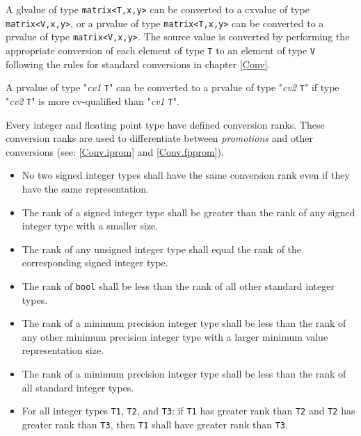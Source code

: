 \p A glvalue of type \texttt{matrix<T,x,y>} can be converted to a cxvalue of
type \texttt{matrix<V,x,y>}, or a prvalue of type \texttt{matrix<T,x,y>} can be
converted to a prvalue of type \texttt{matrix<V,x,y>}. The source value is
converted by performing the appropriate conversion of each element of type
\texttt{T} to an element of type \texttt{V} following the rules for standard
conversions in chapter \ref{Conv}.


A prvalue of type "\textit{cv1} \texttt{T}" can be converted to a prvalue of type
"\textit{cv2} \texttt{T}" if type "\textit{cv2} \texttt{T}" is more cv-qualified
than "\textit{cv1} \texttt{T}".


\p Every integer and floating point type have defined conversion ranks. These
conversion ranks are used to differentiate between \textit{promotions} and other
conversions (see: \ref{Conv.iprom} and \ref{Conv.fpprom}).


\begin{itemize}
  \item  No two signed integer types shall have the same conversion rank even if
  they have the same representation.
  \item The rank of a signed integer type shall be greater than the rank of any
  signed integer type with a smaller size.
  \item The rank of any unsigned integer type shall equal the rank of the
  corresponding signed integer type.
  \item The rank of \texttt{bool} shall be less than the rank of all other
  standard integer types.
  \item The rank of a minimum precision integer type shall be less than the rank
  of any other minimum precision integer type with a larger minimum value
  representation size.
  \item The rank of a minimum precision integer type shall be less than the rank
  of all standard integer types.
  \item For all integer types \texttt{T1}, \texttt{T2}, and \texttt{T3}: if
  \texttt{T1} has greater rank than \texttt{T2} and \texttt{T2} has greater rank
  than \texttt{T3}, then \texttt{T1} shall have greater rank than \texttt{T3}.
\end{itemize}

